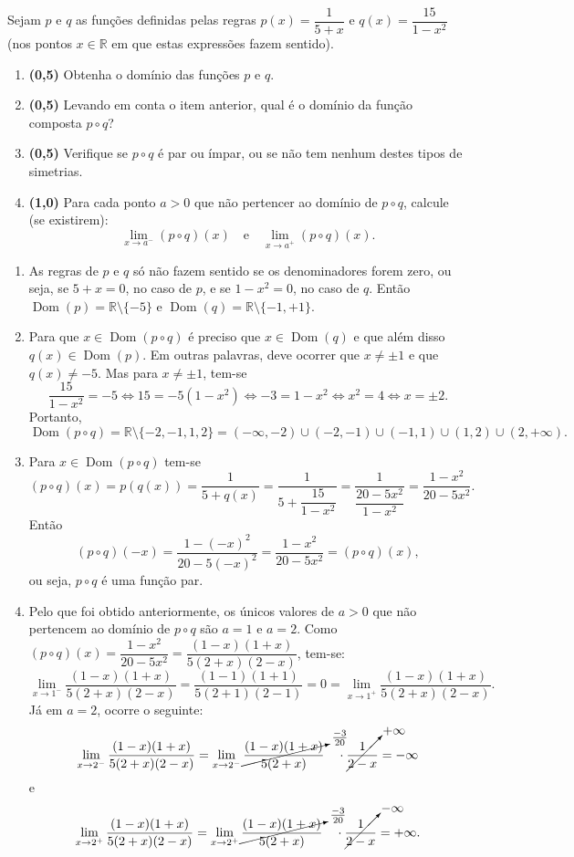 \documentclass[12pt,a4paper]{article}
\newcommand*\dom[1]{\operatorname{Dom}\left(#1\right)}
\newcommand*\R{\mathbb{R}}
\begin{document}
\begin{ExerciseList}
\Exercise[title={2,5}] Sejam $p$ e $q$ as funções definidas pelas regras $p(x) = \dfrac{1}{5+x}$ e $q(x) = \dfrac{15}{1-x^2}$ (nos pontos $x \in \R$ em que estas expressões fazem sentido).
\begin{enumerate}
\item \textbf{(0,5)} Obtenha o domínio das funções $p$ e $q$.
\item \textbf{(0,5)} Levando em conta o item anterior, qual é o domínio da função composta $p \circ q$?
\item \textbf{(0,5)} Verifique se $p\circ q$ é par ou ímpar, ou se não tem nenhum destes tipos de simetrias.
\item \textbf{(1,0)} Para cada ponto $a > 0$ que não pertencer ao domínio de $p\circ q$, calcule (se existirem):
\[
\lim_{x \to a^-} (p\circ q)(x)
\quad \text{e} \quad
\lim_{x \to a^+} (p\circ q)(x).
\]
\end{enumerate}
\Answer
\begin{enumerate}
\item As regras de $p$ e $q$ só não fazem sentido se os denominadores forem zero, ou seja, se $5+x = 0$, no caso de $p$, e se $1-x^2 = 0$, no caso de $q$. Então $\dom{p} = \R \setminus \{ -5\}$ e $\dom{q} = \R \setminus \{ -1, +1 \}$.
\item Para que $x \in \dom{p \circ q}$ é preciso que $x \in \dom{q}$ e que além disso $q(x) \in \dom{p}$. Em outras palavras, deve ocorrer que $x \neq \pm 1$ e que $q(x) \neq -5$. Mas para $x \neq \pm 1$, tem-se
\[
\dfrac{15}{1-x^2} = -5
\Leftrightarrow 15 = -5( 1-x^2 )
\Leftrightarrow -3 = 1-x^2
\Leftrightarrow x^2 = 4
\Leftrightarrow x = \pm 2.
\]
Portanto,
\[
\dom{p \circ q} = \R \setminus \{-2, -1, 1, 2\} = (-\infty, -2) \cup (-2,-1) \cup (-1,1) \cup (1,2) \cup (2, +\infty).
\]
\item Para $x \in \dom{p \circ q}$ tem-se
\[
(p \circ q) (x)
= p(q(x))
= \dfrac{1}{5+q(x)}
= \dfrac{1}{5+\dfrac{15}{1-x^2}}
= \dfrac{1}{\dfrac{20-5x^2}{1-x^2}}
= \dfrac{1-x^2}{20-5x^2}.
\]
Então
\[
(p \circ q) (-x)
= \dfrac{1-(-x)^2}{20-5(-x)^2}
= \dfrac{1-x^2}{20-5x^2}
= (p \circ q) (x),
\]
ou seja, $p \circ q$ é uma função par.
\item Pelo que foi obtido anteriormente, os únicos valores de $a>0$ que não pertencem ao domínio de $p \circ q$ são $a = 1$ e $a = 2$. Como $(p \circ q)(x) = \dfrac{1-x^2}{20-5x^2} = \dfrac{(1-x)(1+x)}{5(2+x)(2-x)}$, tem-se:
\[
\lim_{x \to 1^-} \dfrac{(1-x)(1+x)}{5(2+x)(2-x)}
= \dfrac{(1-1)(1+1)}{5(2+1)(2-1)}
= 0
=
\lim_{x \to 1^+} \dfrac{(1-x)(1+x)}{5(2+x)(2-x)}.
\]
Já em $a=2$, ocorre o seguinte:
\[
\lim_{x \to 2^-} \dfrac{(1-x)(1+x)}{5(2+x)(2-x)}
= \lim_{x \to 2^-} \cancelto{\frac{-3}{20}}{ \dfrac{(1-x)(1+x)}{5(2+x)} }
\quad
\cdot \cancelto{ +\infty }{\frac{1}{2-x}}
= - \infty
\]
e
\[
\lim_{x \to 2^+} \dfrac{(1-x)(1+x)}{5(2+x)(2-x)}
= \lim_{x \to 2^+} \cancelto{\frac{-3}{20}}{ \dfrac{(1-x)(1+x)}{5(2+x)} }
\quad
\cdot \cancelto{ -\infty }{\frac{1}{2-x}}
= +\infty.
\]
\end{enumerate}


\end{ExerciseList}
\end{document}
